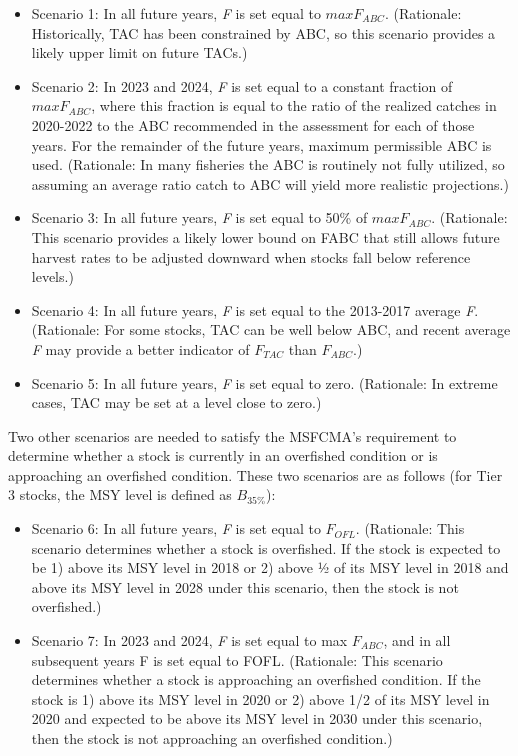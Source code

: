 \documentclass[
  11pt,
]{article}
\begin{document}
\begin{itemize}
\item
  Scenario 1: In all future years, \emph{F} is set equal to \(max F_{ABC}\). (Rationale: Historically, TAC has been constrained by ABC, so this scenario provides a likely upper limit on future TACs.)
\item
  Scenario 2: In 2023 and 2024, \emph{F} is set equal to a constant fraction of \(max F_{ABC}\), where this fraction is equal to the ratio of the realized catches in 2020-2022 to the ABC recommended in the assessment for each of those years.
  For the remainder of the future years, maximum permissible ABC is used. (Rationale: In many fisheries the ABC is routinely not fully utilized, so assuming an average ratio catch to ABC will yield more realistic projections.)
\item
  Scenario 3: In all future years, \emph{F} is set equal to 50\% of \(max F_{ABC}\). (Rationale: This scenario provides a likely lower bound on FABC that still allows future harvest rates to be adjusted downward when stocks fall below reference levels.)
\item
  Scenario 4: In all future years, \emph{F} is set equal to the 2013-2017 average \emph{F}. (Rationale: For some stocks, TAC can be well below ABC, and recent average \emph{F} may provide a better indicator of \(F_{TAC}\) than \(F_{ABC}\).)
\item
  Scenario 5: In all future years, \emph{F} is set equal to zero. (Rationale: In extreme cases, TAC may be set at a level close to zero.)
\end{itemize}

Two other scenarios are needed to satisfy the MSFCMA's requirement to determine whether a stock is currently in an overfished condition or is approaching an overfished condition.
These two scenarios are as follows (for Tier 3 stocks, the MSY level is defined as \(B_{35\%}\)):

\begin{itemize}
\item
  Scenario 6: In all future years, \emph{F} is set equal to \(F_{OFL}\). (Rationale: This scenario determines whether a stock is overfished. If the stock is expected to be 1) above its MSY level in 2018 or 2) above ½ of its MSY level in 2018 and above its MSY level in 2028 under this scenario, then the stock is not overfished.)
\item
  Scenario 7: In 2023 and 2024, \emph{F} is set equal to max \(F_{ABC}\), and in all subsequent years F is set equal to FOFL. (Rationale: This scenario determines whether a stock is approaching an overfished condition. If the stock is 1) above its MSY level in 2020 or 2) above 1/2 of its MSY level in 2020 and expected to be above its MSY level in 2030 under this scenario, then the stock is not approaching an overfished condition.)
\end{itemize}
\end{document}
